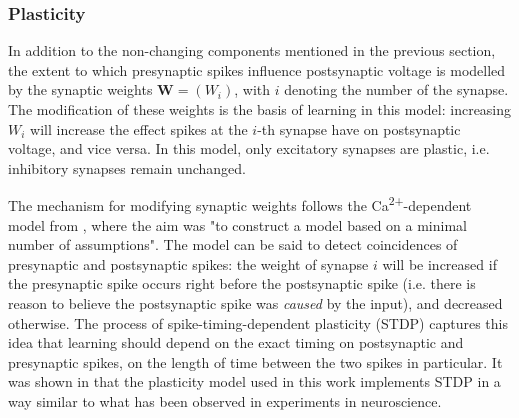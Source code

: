 \documentclass[a4paper,12pt]{report}
\theoremstyle{definition}
\begin{document}



















\subsubsection{Plasticity}

In addition to the non-changing components mentioned in the previous section, the extent to which presynaptic spikes influence postsynaptic voltage is modelled by the synaptic weights $\boldsymbol{W}=(W_i)$, with $i$ denoting the number of the synapse. The modification of these weights is the basis of learning in this model: increasing $W_i$ will increase the effect spikes at the $i$-th synapse have on postsynaptic voltage, and vice versa. In this model, only excitatory synapses are plastic, i.e. inhibitory synapses remain unchanged.

The mechanism for modifying synaptic weights follows the Ca\textsuperscript{2+}-dependent model from \cite{shouval2002unified}, where the aim was "to construct a model based on a minimal number of assumptions". The model can be said to detect coincidences of presynaptic and postsynaptic spikes: the weight of synapse $i$ will be increased if the presynaptic spike occurs right before the postsynaptic spike (i.e. there is reason to believe the postsynaptic spike was \emph{caused} by the input), and decreased otherwise. The process of spike-timing-dependent plasticity (STDP) captures this idea that learning should depend on the exact timing on postsynaptic and presynaptic spikes, on the length of time between the two spikes in particular. It was shown in \cite{shouval2002unified} that the plasticity model used in this work implements STDP in a way similar to what has been observed in experiments in neuroscience.
\end{document}
